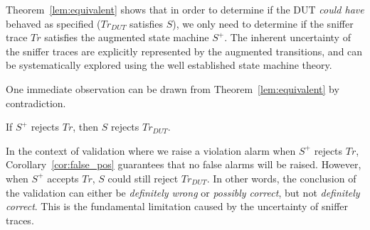 Theorem~\ref{lem:equivalent} shows that in order to determine if the DUT
\textit{could have} behaved as specified ($Tr_{DUT}$ satisfies $S$), we only
need to determine if the sniffer trace $Tr$ satisfies the augmented state
machine $S^+$.
%
The inherent uncertainty of the sniffer traces are explicitly represented by the
augmented transitions, and can be systematically explored using the well
established state machine theory.

One immediate observation can be drawn from Theorem~\ref{lem:equivalent} by
contradiction.

\begin{corollary}
  If $S^+$ rejects $Tr$, then $S$ rejects $Tr_{DUT}$.
  \label{cor:false_pos}
\end{corollary}
%
In the context of validation where we raise a violation alarm when $S^+$
rejects $Tr$, Corollary~\ref{cor:false_pos} guarantees that no false alarms will be
raised.
%
However, when $S^+$ accepts $Tr$, $S$ could still reject $Tr_{DUT}$.
%
In other words, the conclusion of the validation can either be \textit{definitely
wrong} or \textit{possibly correct}, but not \textit{definitely correct}.
%
This is the fundamental limitation caused by the uncertainty of sniffer traces.
